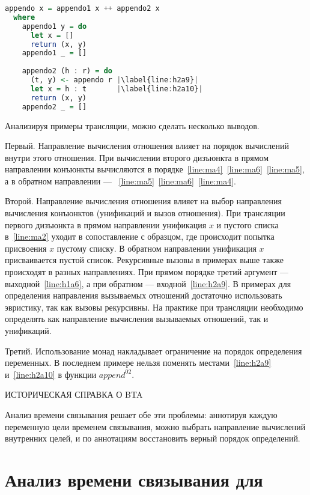 \documentclass[conference,american,russian]{IEEEtran}
\begin{document}
\begin{lstlisting}[language=Haskell, frame=single, escapechar=|]
appendo x = appendo1 x ++ appendo2 x
  where
    appendo1 y = do
      let x = []
      return (x, y)
    appendo1 _ = []
    
    appendo2 (h : r) = do
      (t, y) <- appendo r |\label{line:h2a9}|
      let x = h : t       |\label{line:h2a10}|
      return (x, y)
    appendo2 _ = []
\end{lstlisting}

Анализируя примеры трансляции, можно сделать несколько выводов.

Первый. Направление вычисления отношения влияет на порядок вычислений внутри этого отношения.
При вычислении второго дизъюнкта в прямом направлении конъюнкты вычисляются в порядке~\ref{line:ma4}~\ref{line:ma6}~\ref{line:ma5}, а в обратном направлении --- ~\ref{line:ma5}~\ref{line:ma6}~\ref{line:ma4}.

Второй. Направление вычисления отношения влияет на выбор направления вычисления конъюнктов (унификаций и вызов отношения).
При трансляции первого дизъюнкта в прямом направлении унификация $x$ и пустого списка в~\ref{line:ma2} уходит в сопоставление с образцом, где происходит попытка присвоения $x$ пустому списку.
В обратном направлении унификация $x$ присваивается пустой список.
Рекурсивные вызовы в примерах выше также происходят в разных направлениях.
При прямом порядке третий аргумент --- выходной~\ref{line:h1a6}, а при обратном --- входной~\ref{line:h2a9}.
В примерах для определения направления вызываемых отношений достаточно использовать эвристику, так как вызовы рекурсивны.
На практике при трансляции необходимо определять как направление вычисления вызываемых отношений, так и унификаций.

Третий. Использование монад накладывает ограничение на порядок определения переменных.
В последнем примере нельзя поменять местами~\ref{line:h2a9} и~\ref{line:h2a10} в функции $append^02$.

ИСТОРИЧЕСКАЯ СПРАВКА О BTA

Анализ времени связывания решает обе эти проблемы: аннотируя каждую переменную цели временем связывания, можно выбрать направление вычислений внутренних целей, и по аннотациям восстановить верный порядок определений.

\section{Анализ времени связывания для \miniKanren{}}\label{bta}
\end{document}
